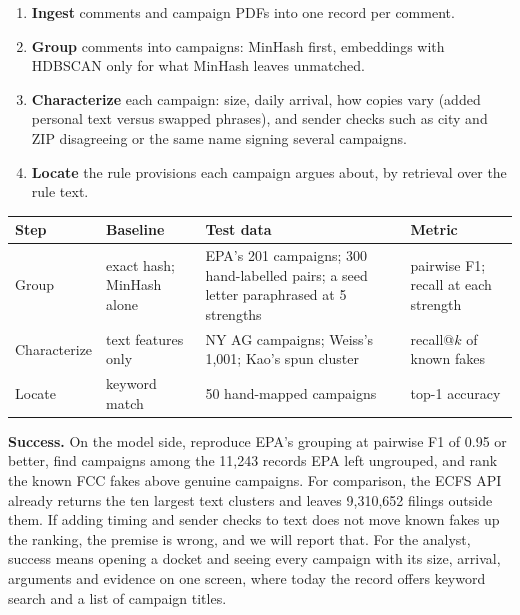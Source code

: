 \documentclass[11pt]{article}
\begin{document}
\begin{enumerate}
  \item \textbf{Ingest} comments and campaign PDFs into one record per comment.
  \item \textbf{Group} comments into campaigns: MinHash first, embeddings with HDBSCAN only for what
        MinHash leaves unmatched.
  \item \textbf{Characterize} each campaign: size, daily arrival, how copies vary (added personal
        text versus swapped phrases), and sender checks such as city and ZIP disagreeing or the same
        name signing several campaigns.
  \item \textbf{Locate} the rule provisions each campaign argues about, by retrieval over the rule text.
\end{enumerate}

\begin{center}
\small
\renewcommand{\arraystretch}{1.2}
\begin{tabular}{@{}L{0.12\textwidth}L{0.21\textwidth}L{0.36\textwidth}L{0.23\textwidth}@{}}
\toprule
\textbf{Step} & \textbf{Baseline} & \textbf{Test data} & \textbf{Metric} \\
\midrule
Group & exact hash; MinHash alone & EPA's 201 campaigns; 300 hand-labelled pairs; a seed letter
paraphrased at 5 strengths & pairwise F1; recall at each strength \\
\addlinespace[2pt]
Characterize & text features only & NY AG campaigns; Weiss's 1{,}001; Kao's spun cluster &
recall@$k$ of known fakes \\
\addlinespace[2pt]
Locate & keyword match & 50 hand-mapped campaigns & top-1 accuracy \\
\bottomrule
\end{tabular}
\end{center}

\textbf{Success.} On the model side, reproduce EPA's grouping at pairwise F1 of 0.95 or better, find
campaigns among the 11{,}243 records EPA left ungrouped, and rank the known FCC fakes above genuine
campaigns. For comparison, the ECFS API already returns the ten largest text clusters and leaves
9{,}310{,}652 filings outside them. If adding timing and sender checks to text does not move known
fakes up the ranking, the premise is wrong, and we will report that. For the analyst, success means
opening a docket and seeing every campaign with its size, arrival, arguments and evidence on one
screen, where today the record offers keyword search and a list of campaign titles.
\end{document}
